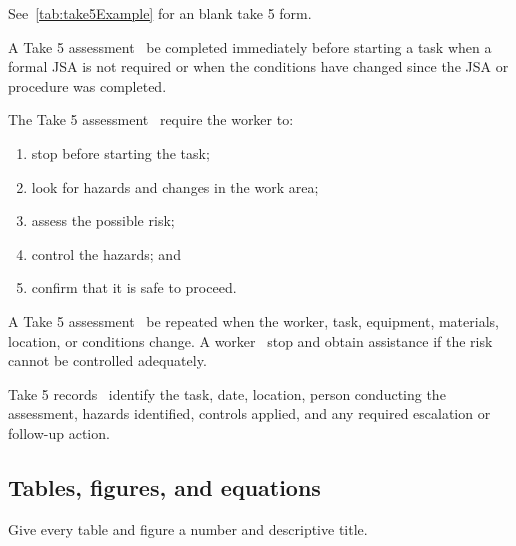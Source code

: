 See~\ref{tab:take5Example} for an blank take 5 form.

A Take 5 assessment \must~be completed immediately before starting a task when a formal JSA is not required or when the conditions have changed since the JSA or procedure was completed.

The Take 5 assessment \must~require the worker to:
\begin{enumerate}
    \item stop before starting the task;
    \item look for hazards and changes in the work area;
    \item assess the possible risk;
    \item control the hazards; and
    \item confirm that it is safe to proceed.
\end{enumerate}

A Take 5 assessment \must~be repeated when the worker, task, equipment, materials, location, or conditions change. A worker \must~stop and obtain assistance if the risk cannot be controlled adequately.



Take 5 records \must~identify the task, date, location, person conducting the assessment, hazards identified, controls applied, and any required escalation or follow-up action.

\subsection{Tables, figures, and equations}

Give every table and figure a number and descriptive title.

